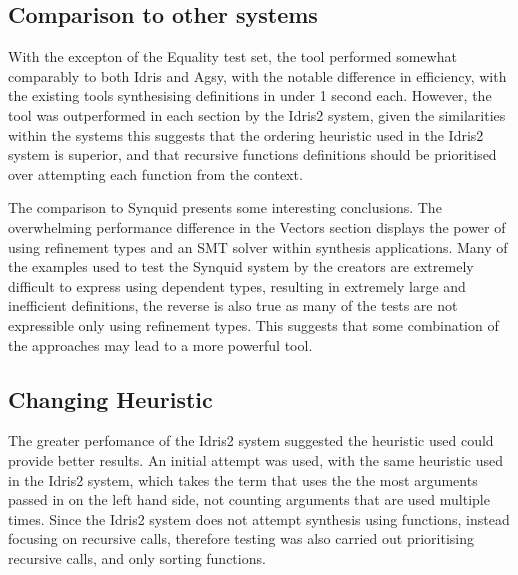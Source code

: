 \documentclass[a4paper]{article}
\begin{document}
\subsection{Comparison to other systems}
\label{sec:orga2f8b7e}

With the excepton of the Equality test set, the tool performed somewhat
comparably to both Idris and Agsy, with the notable difference in efficiency,
with the existing tools synthesising definitions in under 1 second each.
However, the tool was outperformed in each section by the Idris2 system,
given the similarities within the systems this suggests that the
ordering heuristic used in the Idris2 system is superior, and that
recursive functions definitions should be prioritised over attempting each
function from the context.

The comparison to Synquid presents some interesting conclusions.
The overwhelming performance difference in the Vectors section  
displays the power of using refinement types and an SMT solver
within synthesis applications. Many of the examples used to test
the Synquid system by the creators are extremely difficult to
express using dependent types, resulting in extremely large and
inefficient definitions, the reverse is also true as many of the
tests are not expressible only using refinement types. This suggests
that some combination of the approaches may lead to a more powerful
tool. 

\subsection{Changing Heuristic}
The greater perfomance of the Idris2 system suggested the heuristic used
could provide better results. An initial attempt was used, with the same
heuristic used in the Idris2 system, which takes the term that uses the
the most arguments passed in on the left hand side, not counting arguments
that are used multiple times. Since the Idris2 system does not attempt
synthesis using functions, instead focusing on recursive calls, therefore
testing was also carried out prioritising recursive calls, and only
sorting functions. 
\end{document}
